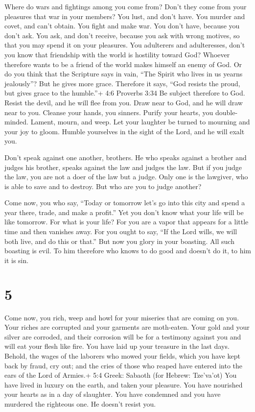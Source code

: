  Where do wars and fightings among you come from? Don't they
come from your pleasures that war in your members?  You
lust, and don't have. You murder and covet, and can't obtain. You fight
and make war. You don't have, because you don't ask.  You
ask, and don't receive, because you ask with wrong motives, so that you
may spend it on your pleasures.  You adulterers and
adulteresses, don't you know that friendship with the world is hostility
toward God? Whoever therefore wants to be a friend of the world makes
himself an enemy of God.  Or do you think that the Scripture
says in vain, ``The Spirit who lives in us yearns jealously''?
 But he gives more grace. Therefore it says, ``God resists
the proud, but gives grace to the humble.''+ 4:6 Proverbs 3:34
 Be subject therefore to God. Resist the devil, and he will
flee from you.  Draw near to God, and he will draw near to
you. Cleanse your hands, you sinners. Purify your hearts, you
double-minded.  Lament, mourn, and weep. Let your laughter
be turned to mourning and your joy to gloom.  Humble
yourselves in the sight of the Lord, and he will exalt you.

 Don't speak against one another, brothers. He who speaks
against a brother and judges his brother, speaks against the law and
judges the law. But if you judge the law, you are not a doer of the law
but a judge.  Only one is the lawgiver, who is able to save
and to destroy. But who are you to judge another?

 Come now, you who say, ``Today or tomorrow let's go into
this city and spend a year there, trade, and make a profit.''
 Yet you don't know what your life will be like tomorrow.
For what is your life? For you are a vapor that appears for a little
time and then vanishes away.  For you ought to say, ``If
the Lord wills, we will both live, and do this or that.'' 
But now you glory in your boasting. All such boasting is evil.
 To him therefore who knows to do good and doesn't do it,
to him it is sin.

\hypertarget{section-4}{%
\section{5}\label{section-4}}

 Come now, you rich, weep and howl for your miseries that
are coming on you.  Your riches are corrupted and your
garments are moth-eaten.  Your gold and your silver are
corroded, and their corrosion will be for a testimony against you and
will eat your flesh like fire. You have laid up your treasure in the
last days.  Behold, the wages of the laborers who mowed your
fields, which you have kept back by fraud, cry out; and the cries of
those who reaped have entered into the ears of the Lord of Armies.+ 5:4
Greek: Sabaoth (for Hebrew: Tze'va'ot)  You have lived in
luxury on the earth, and taken your pleasure. You have nourished your
hearts as in a day of slaughter.  You have condemned and you
have murdered the righteous one. He doesn't resist you.

